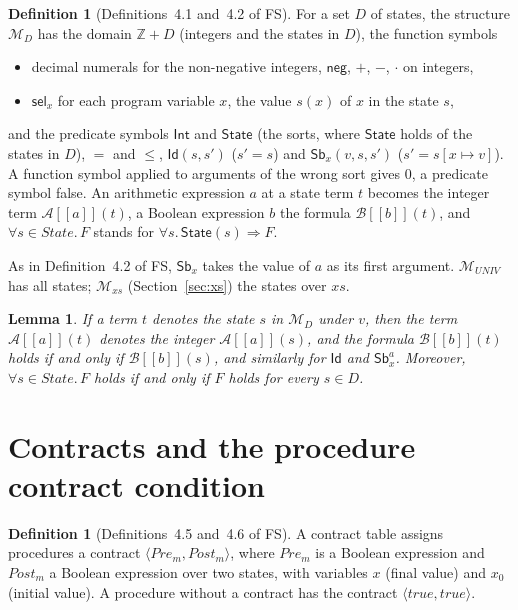 \documentclass[11pt]{article}
\newcommand{\sem}[1]{[\![ #1 ]\!]}
\newcommand{\Id}{\mathsf{Id}}
\newcommand{\Sb}[2]{\mathsf{Sb}^{#1}_{#2}}
\newcommand{\State}{\mathit{State}}
\newcommand{\Pre}{\mathit{Pre}}
\newcommand{\Post}{\mathit{Post}}
\newcommand{\M}{\mathcal{M}}
\newcommand{\Z}{\mathbb{Z}}
\newcommand{\tsel}[1]{\mathsf{sel}_{#1}}
\newcommand{\A}{\mathcal{A}}
\newcommand{\B}{\mathcal{B}}
\newcommand{\Th}[1]{#1 of FS}
\theoremstyle{plain}
\newtheorem{lemma}[theorem]{Lemma}
\theoremstyle{definition}
\newtheorem{definition}[theorem]{Definition}
\theoremstyle{remark}
\begin{document}
\begin{definition}[\Th{Definitions~4.1 and~4.2}]\label{def:model}
  For a set $D$ of states, the structure $\M_D$ has the domain
  $\Z + D$ (integers and the states in $D$), the function symbols
  \begin{itemize}
  \item decimal numerals for the non-negative integers, $\mathsf{neg}$,
    $+$, $-$, $\cdot$ on integers,
  \item $\tsel{x}$ for each program variable $x$, the value $s(x)$ of $x$
    in the state $s$,
  \end{itemize}
  and the predicate symbols $\mathsf{Int}$ and $\mathsf{State}$ (the
  sorts, where $\mathsf{State}$ holds of the states in $D$), $=$ and $\le$,
  $\Id(s, s')$ ($s' = s$) and $\Sb{}{x}(v, s, s')$ ($s' = s[x \mapsto v]$).
  A function symbol applied to arguments of the wrong sort gives $0$, a
  predicate symbol false. An arithmetic expression $a$ at a state term
  $t$ becomes the integer term $\A\sem{a}(t)$, a Boolean expression $b$
  the formula $\B\sem{b}(t)$, and $\forall s \in \State.\, F$ stands for
  $\forall s.\, \mathsf{State}(s) \Rightarrow F$.
\end{definition}

As in \Th{Definition~4.2}, $\Sb{}{x}$ takes the value of $a$ as its
first argument. $\M_{\mathit{UNIV}}$ has all states; $\M_{xs}$
(Section~\ref{sec:xs}) the states over $xs$.

\begin{lemma}
  If a term $t$ denotes the state $s$ in $\M_D$ under $v$, then the term
  $\A\sem{a}(t)$ denotes the integer $\A\sem{a}(s)$, and the formula
  $\B\sem{b}(t)$ holds if and only if $\B\sem{b}(s)$, and similarly for $\Id$ and
  $\Sb{a}{x}$. Moreover, $\forall s \in \State.\, F$ holds if and only if
  $F$ holds for every $s \in D$.
\end{lemma}

\section{Contracts and the procedure contract condition}\label{sec:pcc}

\begin{definition}[\Th{Definitions~4.5 and~4.6}]\label{def:contracts}
  A contract table assigns procedures a contract $\langle \Pre_m,
  \Post_m\rangle$, where $\Pre_m$ is a Boolean expression and $\Post_m$ a
  Boolean expression over two states, with variables $x$ (final value) and
  $x_0$ (initial value). A procedure without a contract has the contract
  $\langle \mathit{true}, \mathit{true}\rangle$.
\end{definition}
\end{document}
